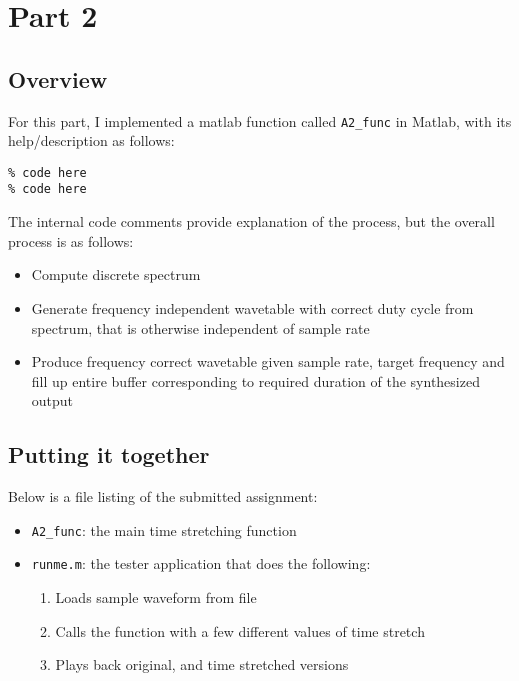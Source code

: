 \documentclass[12pt]{article}
\begin{document}
\newpage

\section*{Part 2}

\subsection*{Overview}
For this part, I implemented a matlab function called \verb|A2_func| in Matlab, with its help/description as follows:

\begin{verbatim}
% code here
% code here
\end{verbatim}

The internal code comments provide explanation of the process, but the overall process is as follows:

\begin{itemize}
\item{Compute discrete spectrum}
\item{Generate frequency independent wavetable with correct duty cycle from spectrum, that is otherwise independent of sample rate}
\item{Produce frequency correct wavetable given sample rate, target frequency and fill up entire buffer corresponding to required duration of the synthesized output}
\end{itemize}


\subsection*{Putting it together}
Below is a file listing of the submitted assignment:
\begin{itemize}
\item \verb|A2_func|: the main time stretching function
\item \verb|runme.m|: the tester application that does the following:
\begin{enumerate}
	\item 	Loads sample waveform from file
	\item   Calls the function with a few different values of time stretch
	\item	Plays back original, and time stretched versions
\end{enumerate}
\end{itemize}
\end{document}
